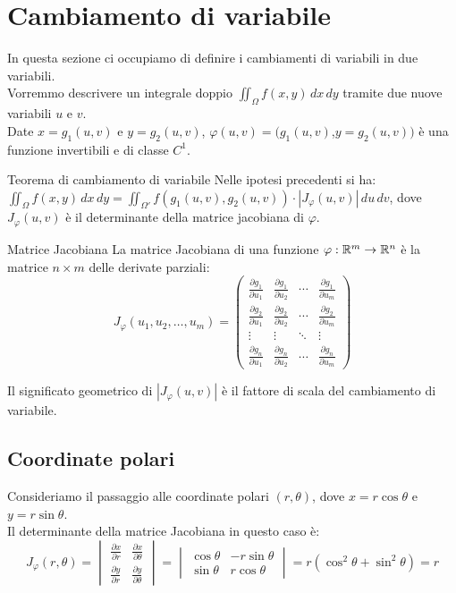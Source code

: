 \section{Cambiamento di variabile}
In questa sezione ci occupiamo di definire i cambiamenti di variabili in due variabili.\\
Vorremmo descrivere un integrale doppio $\iint_{\Omega} f(x,y) \, dx \, dy$ tramite due nuove variabili $u$ e $v$.\\
Date $x = g_1(u,v)$ e $y = g_2(u,v)$, $\varphi(u,v)=(g_1(u,v)$,$y = g_2(u,v))$ è una funzione invertibili e di classe $C^1$.

\begin{teorema}{Teorema di cambiamento di variabile}
  Nelle ipotesi precedenti si ha: $\iint_{\Omega} f(x,y) \, dx \, dy = \iint_{\Omega'} f(g_1(u,v),g_2(u,v)) \cdot |J_{\varphi}(u,v)| \, du \, dv$, dove $J_{\varphi}(u,v)$ è il determinante della matrice jacobiana di $\varphi$.
\end{teorema}

\begin{definizione}{Matrice Jacobiana}
  La matrice Jacobiana di una funzione $\varphi: \mathbb{R}^m \rightarrow \mathbb{R}^n$ è la matrice $n \times m$ delle derivate parziali:
  \[
  J_{\varphi}(u_1, u_2, \ldots, u_m) = \begin{pmatrix}
  \frac{\partial g_1}{\partial u_1} & \frac{\partial g_1}{\partial u_2} & \cdots & \frac{\partial g_1}{\partial u_m} \\
  \frac{\partial g_2}{\partial u_1} & \frac{\partial g_2}{\partial u_2} & \cdots & \frac{\partial g_2}{\partial u_m} \\
  \vdots & \vdots & \ddots & \vdots \\
  \frac{\partial g_n}{\partial u_1} & \frac{\partial g_n}{\partial u_2} & \cdots & \frac{\partial g_n}{\partial u_m}
  \end{pmatrix}
  \]
\end{definizione}

\begin{osservazione}{}
  Il significato geometrico di $|J_{\varphi}(u,v)|$ è il fattore di scala del cambiamento di variabile.
\end{osservazione}

\subsection{Coordinate polari}
Consideriamo il passaggio alle coordinate polari $(r, \theta)$, dove $x = r \cos \theta$ e $y = r \sin \theta$.\\
Il determinante della matrice Jacobiana in questo caso è:
\[
J_{\varphi}(r,\theta) = \begin{vmatrix}
\frac{\partial x}{\partial r} & \frac{\partial x}{\partial \theta} \\
\frac{\partial y}{\partial r} & \frac{\partial y}{\partial \theta}
\end{vmatrix} = \begin{vmatrix}
\cos \theta & -r \sin \theta \\
\sin \theta & r \cos \theta
\end{vmatrix} = r (\cos^2 \theta + \sin^2 \theta) = r
\]

